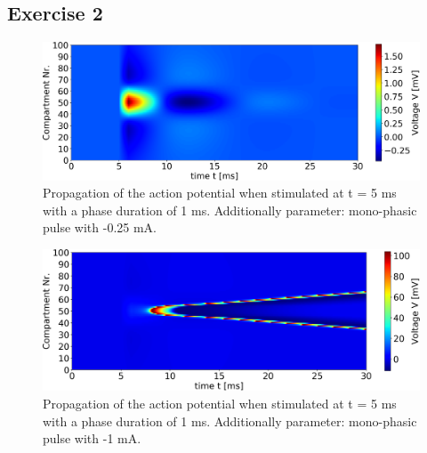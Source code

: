 \documentclass{scrartcl}			%
\begin{document}
\subsection{Exercise 2}
\begin{figure}[hbpt!]					%
	\begin{flushleft}
		\hspace*{-0.3in}
		\includegraphics[scale=0.47]{3_1.png}
		\captionsetup{width=\linewidth}  %
		\caption{ Propagation of the action potential when stimulated at t = 5 ms with a phase duration of 1 ms. Additionally parameter: mono-phasic pulse	with -0.25 mA.}
		\label{fig31} %
	\end{flushleft}
\end{figure}
\begin{figure}[hbpt!]					%
	\begin{flushleft}
		\hspace*{-0.3in}
		\includegraphics[scale=0.47]{3_2.png}
		\captionsetup{width=\linewidth}  %
		\caption{Propagation of the action potential when stimulated at t = 5 ms with a phase duration of 1 ms. Additionally parameter: mono-phasic pulse with -1 mA.}		
		\label{fig32} %
	\end{flushleft}
\end{figure}
\end{document}
